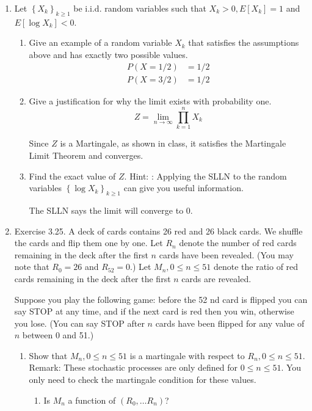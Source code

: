 \documentclass{article} %
\theoremstyle{plain}
\theoremstyle{case}
\begin{document}
\begin{enumerate}[label={\fbox{\textbf{Exercise \#\arabic* :}}}]
  \item Let $\left\{X_k\right\}_{k \geq 1}$ be i.i.d. random variables such that $X_k>0, E\left[X_k\right]=1$ and $E\left[\log X_k\right]<0$.
  \begin{enumerate}
     \item Give an example of a random variable $X_k$ that satisfies the assumptions above and has exactly two possible values.
       \begin{align*}
         P(X=1/2) &= 1/2 \\
         P(X=3/2) &= 1/2
       \end{align*}
    \item  Give a justification for why the limit exists with probability one.
      \[ Z=\lim _{n \rightarrow \infty} \prod_{k=1}^n X_k \]


  Since $Z$ is a Martingale, as shown in class, it satisfies the 
  Martingale Limit Theorem and converges.

    \item  Find the exact value of $Z$. Hint: : Applying the SLLN to the random variables $\left\{\log X_k\right\}_{k \geq 1}$ can give you useful information.

      The SLLN says the limit will converge to 0.
  \end{enumerate}
\newpage
  \item Exercise 3.25. A deck of cards contains 26 red and 26 black cards. We shuffle the cards and flip them one by one. Let $R_n$ denote the number of red cards remaining in the deck after the first $n$ cards have been revealed. (You may note that $R_0=26$ and $R_{52}=0$.) Let $M_n, 0 \leq n \leq 51$ denote the ratio of red cards remaining in the deck after the first $n$ cards are revealed.

Suppose you play the following game: before the 52 nd card is flipped you can say STOP at any time, and if the next card is red then you win, otherwise you lose. (You can say STOP after $n$ cards have been flipped for any value of $n$ between 0 and 51.)

    \begin{enumerate}
    \item  Show that $M_n, 0 \leq n \leq 51$ is a martingale with respect to $R_n, 0 \leq n \leq 51$.
Remark: These stochastic processes are only defined for $0 \leq n \leq 51$. You only need to check the martingale condition for these values.
  \begin{enumerate}
      \item Is $M_n$ a function of $(R_0, \dots R_n)$?


\end{enumerate}
\end{enumerate}
\end{enumerate}
\end{document}
